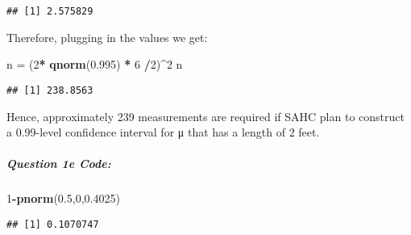 \documentclass[
]{article}
\newenvironment{Shaded}{\begin{snugshade}}{\end{snugshade}}
\newcommand{\DecValTok}[1]{\textcolor[rgb]{0.00,0.00,0.81}{#1}}
\newcommand{\FloatTok}[1]{\textcolor[rgb]{0.00,0.00,0.81}{#1}}
\newcommand{\FunctionTok}[1]{\textcolor[rgb]{0.13,0.29,0.53}{\textbf{#1}}}
\newcommand{\NormalTok}[1]{#1}
\newcommand{\OtherTok}[1]{\textcolor[rgb]{0.56,0.35,0.01}{#1}}
\newcommand{\SpecialCharTok}[1]{\textcolor[rgb]{0.81,0.36,0.00}{\textbf{#1}}}
\begin{document}
\begin{verbatim}
## [1] 2.575829
\end{verbatim}

Therefore, plugging in the values we get:

\begin{Shaded}
\begin{Highlighting}[]
\NormalTok{n }\OtherTok{=}\NormalTok{ (}\DecValTok{2}\SpecialCharTok{*} \FunctionTok{qnorm}\NormalTok{(}\FloatTok{0.995}\NormalTok{) }\SpecialCharTok{*} \DecValTok{6} \SpecialCharTok{/}\DecValTok{2}\NormalTok{)}\SpecialCharTok{\^{}}\DecValTok{2}
\NormalTok{n}
\end{Highlighting}
\end{Shaded}

\begin{verbatim}
## [1] 238.8563
\end{verbatim}

Hence, approximately 239 measurements are required if SAHC plan to
construct a 0.99-level confidence interval for μ that has a length of 2
feet.

\hypertarget{question-1e-code}{%
\subparagraph{Question 1e Code:}\label{question-1e-code}}

\begin{Shaded}
\begin{Highlighting}[]
\DecValTok{1}\SpecialCharTok{{-}}\FunctionTok{pnorm}\NormalTok{(}\FloatTok{0.5}\NormalTok{,}\DecValTok{0}\NormalTok{,}\FloatTok{0.4025}\NormalTok{)}
\end{Highlighting}
\end{Shaded}

\begin{verbatim}
## [1] 0.1070747
\end{verbatim}
\end{document}
